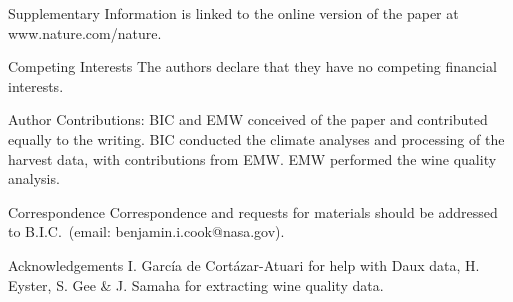 \documentclass[final]{nature}
\begin{document}

\begin{addendum}
 \item [Supplementary Information] is linked to the online version of the paper at www.nature.com/nature.
 \item[Competing Interests] The authors declare that they have no
competing financial interests.
\item [Author Contributions:] BIC and EMW conceived of the paper and contributed equally to the writing. BIC conducted the climate analyses and processing of the harvest data, with contributions from EMW. EMW performed the wine quality analysis.
 \item[Correspondence] Correspondence and requests for materials
should be addressed to B.I.C.~(email: benjamin.i.cook@nasa.gov).
 \item[Acknowledgements] I. Garc\'ia de Cort\'azar-Atuari for help with Daux data, H. Eyster, S. Gee \& J. Samaha for extracting wine quality data.
\end{addendum}
\end{document}
